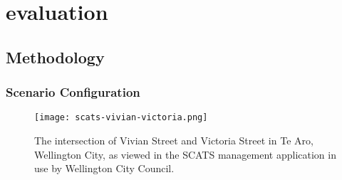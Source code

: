 \chapter{evaluation}

\section{Methodology}

\subsection{Scenario Configuration}

\begin{figure}[]
\centering
	\texttt{[image: scats-vivian-victoria.png]}
	\caption{ The intersection of Vivian Street and Victoria Street in Te Aro, Wellington City, as viewed in the SCATS management application in use by Wellington City Council. }
\label{intersectiondiagram}
\end{figure}